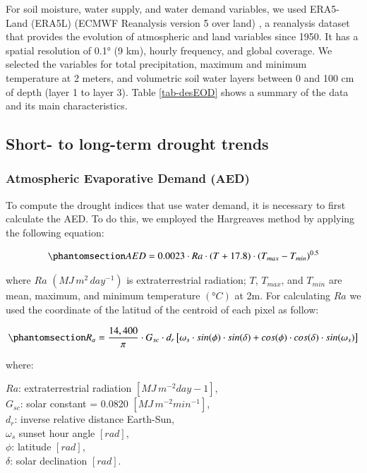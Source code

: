 \documentclass[
  authoryear,
  preprint,
  3p,
  onecolumn]{elsarticle}
\begin{document}
For soil moisture, water supply, and water demand variables, we used
ERA5-Land (ERA5L) (ECMWF Reanalysis version 5 over land)
\citep{MunozSabater2021}, a reanalysis dataset that provides the
evolution of atmospheric and land variables since 1950. It has a spatial
resolution of 0.1° (9 km), hourly frequency, and global coverage. We
selected the variables for total precipitation, maximum and minimum
temperature at 2 meters, and volumetric soil water layers between 0 and
100 cm of depth (layer 1 to layer 3). Table \ref{tab-desEOD} shows a
summary of the data and its main characteristics.

\subsection{Short- to long-term drought
trends}\label{short--to-long-term-drought-trends}

\subsubsection{Atmospheric Evaporative Demand
(AED)}\label{atmospheric-evaporative-demand-aed}

To compute the drought indices that use water demand, it is necessary to
first calculate the AED. To do this, we employed the Hargreaves method
\citep{Hargreaves1994, Hargreaves1985} by applying the following
equation:

\begin{equation}\phantomsection\label{eq-AED}{AED = 0.0023\cdot Ra\cdot (T+17.8)\cdot (T_{max}-T_{min})^{0.5}}\end{equation}

where \(Ra\) \((MJ\,m^2\, day^{-1})\) is extraterrestrial radiation;
\(T\), \(T_{max}\), and \(T_{min}\) are mean, maximum, and minimum
temperature \((°C)\) at 2m. For calculating \(Ra\) we used the
coordinate of the latitud of the centroid of each pixel as follow:

\begin{equation}\phantomsection\label{eq-Ra}{R_a = \frac{14,400}{\pi}\cdot G_{sc}\cdot d_r \left[\omega_s\cdot sin(\phi)\cdot sin(\delta)+cos(\phi)\cdot cos(\delta)\cdot sin(\omega_s) \right]}\end{equation}

where:

\(Ra\): extraterrestrial radiation \([MJ\, m^{-2} day-1]\),\\
\(G_{sc}\): solar constant = 0.0820 \([MJ\,m^{-2} min^{-1}]\),\\
\(d_r\): inverse relative distance Earth-Sun,\\
\(\omega_s\) sunset hour angle \([rad]\),\\
\(\phi\): latitude \([rad]\),\\
\(\delta\): solar declination \([rad]\).
\end{document}
